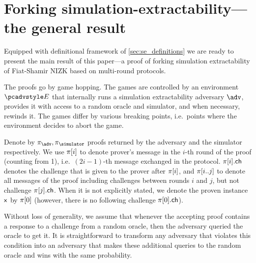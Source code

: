\section{Forking simulation-extractability---the general result}
\label{sec:general}
Equipped with definitional framework of \cref{sec:se_definitions} we are ready
to present the main result of this paper---a proof of
forking simulation extractability of Fiat-Shamir NIZK based on multi-round protocols.

The proofs go by game hopping. The games are controlled by an environment $\env$
that internally runs a simulation extractability adversary $\advse$, provides it
with access to a random oracle and simulator, and when necessary, rewinds it. The
games differ by various breaking points, i.e.~points where the environment
decides to abort the game.

Denote by $\zkproof_{\advse}, \zkproof_{\simulator}$ proofs returned by the
adversary and the simulator respectively. We use $\pi[i]$ to denote
prover's message in the $i$-th round of the proof (counting from 1),
i.e.~$(2i - 1)$-th message exchanged in the protocol. $\pi[i].\mathsf{ch}$ denotes
the challenge that is given to the prover after $\pi[i]$, and
$\pi[i..j]$ to denote all messages of the proof including challenges
between rounds $i$ and $j$, but not challenge $\pi[j].\mathsf{ch}$. When it is not
explicitly stated, we denote the proven instance $\mathsf{x}$ by $\pi[0]$
(however, there is no following challenge $\pi[0].\mathsf{ch}$).

Without loss of generality, we assume that whenever the accepting proof contains
a response to a challenge from a random oracle, then the adversary queried the
oracle to get it. It is straightforward to transform any adversary that violates
this condition into an adversary that makes these additional queries to the
random oracle and wins with the same probability.

